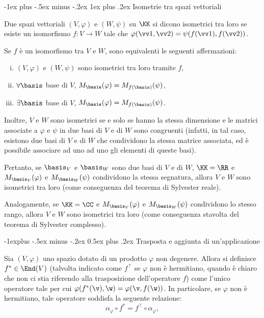 \documentclass[10pt,landscape]{article}
\makeatletter
\renewcommand{\subsection}{\@startsection{subsection}{2}{0mm}%
	{-1explus -.5ex minus -.2ex}%
	{0.5ex plus .2ex}%
	{\normalfont\normalsize\bfseries}}
\renewcommand{\subsubsection}{\@startsection{subsubsection}{3}{0mm}%
	{-1ex plus -.5ex minus -.2ex}%
	{1ex plus .2ex}%
	{\normalfont\small\bfseries}}
\makeatother
\begin{document}
\begin{multicols}{3}
		\subsubsection{Isometrie tra spazi vettoriali}

		Due spazi vettoriali $(V, \varphi)$ e $(W, \psi)$ su $\KK$ si dicono isometrici tra loro se
		esiste un isomorfismo $f : V \to W$ tale che $\varphi(\vv 1, \vv 2) = \psi(f(\vv 1), f(\vv 2))$.

		Se $f$ è un isomorfismo tra $V$ e $W$, sono equivalenti le seguenti affermazioni:

		\begin{enumerate}[(i)]
			\item $(V, \varphi)$ e $(W, \psi)$ sono isometrici tra loro tramite $f$,
			\item $\forall \basis$ base di $V$, $M_\basis(\varphi) = M_{f(\basis)}(\psi)$,
			\item $\exists \basis$ base di $V$, $M_\basis(\varphi) = M_{f(\basis)}(\psi)$.
		\end{enumerate}
		
		Inoltre, $V$ e $W$ sono isometrici se e solo se hanno la stessa dimensione e le matrici associate
		a $\varphi$ e $\psi$ in due basi di $V$ e di $W$ sono congruenti (infatti, in tal caso, esistono due
		basi di $V$ e di $W$ che condividono la stessa matrice associata, ed è possibile associare ad uno
		ad uno gli elementi di queste basi).
		
		Pertanto, se $\basis_V$ e $\basis_W$ sono due basi di $V$ e di $W$, $\KK = \RR$ e $M_{\basis_V}(\varphi)$ e $M_{\basis_W}(\psi)$ condividono la stessa segnatura, allora $V$ e $W$ sono
		isometrici tra loro (come conseguenza del teorema di Sylvester reale).
		
		Analogamente, se $\KK = \CC$ e $M_{\basis_V}(\varphi)$ e $M_{\basis_W}(\psi)$ condividono lo stesso
		rango, allora $V$ e $W$ sono isometrici tra loro (come conseguenza stavolta del teorema di Sylvester
		complesso).
		
		\subsection{Trasposta e aggiunta di un'applicazione}

		Sia $(V, \varphi)$ uno spazio dotato di un prodotto $\varphi$ non degenere. Allora si definisce $f^* \in \End(V)$ (talvolta indicato come $f^\top$ se $\varphi$ non è hermitiano, quando è chiaro che non ci stia riferendo alla trasposizione dell'operatore $f$)
		come l'unico operatore tale per cui $\varphi(f^*(\v), \w) = \varphi(\v, f(\w))$.
		In particolare, se $\varphi$ non è hermitiano, tale operatore soddisfa la seguente relazione:
		\[ \alpha_\varphi \circ f^* = f^\top \circ \alpha_\varphi, \]
		

\end{multicols}
\end{document}
